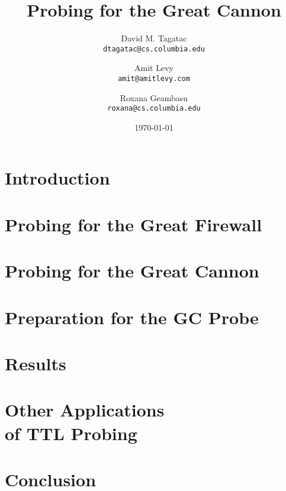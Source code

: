 \documentclass[10pt,twocolumn]{article}
\begin{document}
\title{\bf Probing for the Great Cannon}
\author{
	David M. Tagatac\\
	\texttt{dtagatac@cs.columbia.edu}
	\and
	Amit Levy\\
	\texttt{amit@amitlevy.com}
	\and
	Roxana Geambasu\\
	\texttt{roxana@cs.columbia.edu}
}
\date{\today}
\maketitle
\thispagestyle{empty}

%

\section{Introduction}


\section{Probing for the Great Firewall}


\section{Probing for the Great Cannon}


\section{Preparation for the GC Probe}


\section{Results}


\section{Other Applications\\of TTL Probing}


\section{Conclusion}


{\footnotesize 
}
\end{document}

